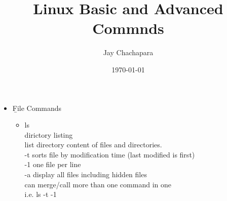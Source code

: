 \documentclass{article}
\title{Linux Basic and Advanced Commnds}
\author{Jay Chachapara}
\date{\today}
\begin{document}
	\maketitle
	\begin{itemize}
		\item \b {File Commands}
			\begin{itemize}
				\item ls \\					
					dirictory listing \\
					list directory content of files and directories.\\
					-t sorts file by modification time (last modified is first)\\
					-1 one file per line \\
					-a display all files including hidden files \\
					can merge/call more than one command in one \\ i.e. ls -t -1\\
					

\end{itemize}
\end{itemize}
\end{document}
